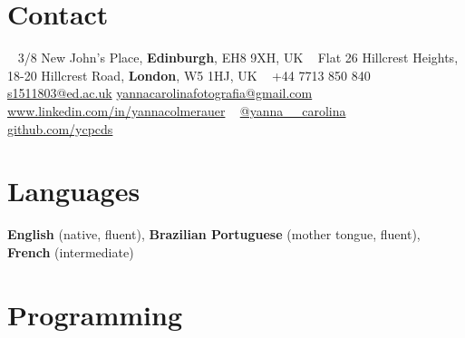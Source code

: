 \documentclass[]{cv-style}          %
\begin{document}
\lastupdated


\begin{aside}
%
\section{Contact} 
~
\textcolor{darkpurple}{\faMapMarker} \hspace{0.1cm} 3/8 New John's Place, 
\textbf{Edinburgh}, EH8 9XH, UK
~
\textcolor{darkpurple}{\faMapMarker} \hspace{0.1cm} Flat 26 Hillcrest Heights, 
18-20 Hillcrest Road, 
\textbf{London}, W5 1HJ, UK
~
\textcolor{darkpurple}{\faPhone} \hspace{0.1cm} +44 7713 850 840
~
\textcolor{darkpurple}{\faEnvelopeO} \hspace{0.1cm} \href{mailto:s1511803@ed.ac.uk}{s1511803@ed.ac.uk}
\small{\href{mailto:yannacarolinafotografia@gmail.com}{\nohyphens{yannacarolinafotografia@gmail.com}}}
~
\normalsize{} \textcolor{darkpurple}{\faLinkedinSquare} \hspace{0.1cm} \url{www.linkedin.com/in/yannacolmerauer}
~
\textcolor{darkpurple}{\faInstagram} \hspace{0.1cm} \textcolor{darkpurple}{\faTwitter} \hspace{0.1cm} \href{https://www.instagram.com/yanna__carolina/}{@yanna\_\_carolina}
~
\textcolor{darkpurple}{} \hspace{0.1cm} \href{https://github.com/ycpcds}{github.com/ycpcds}
~
%
\section{Languages} 
\textbf{English} (native, fluent),
\textbf{Brazilian Portuguese} 
(mother tongue, fluent),
\textbf{French} (intermediate)
~
%
\section{Programming}
~
%
%

\end{aside}
\end{document}
